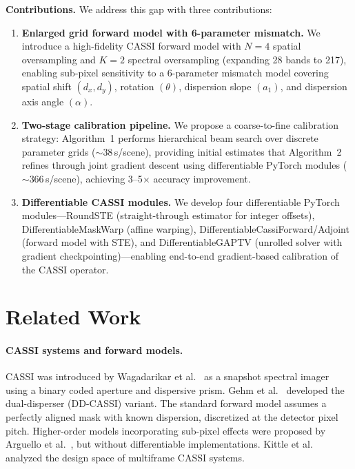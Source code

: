 \documentclass[runningheads]{llncs}
\begin{document}
\textbf{Contributions.}
We address this gap with three contributions:
\begin{enumerate}
    \item \textbf{Enlarged grid forward model with 6-parameter mismatch.}
    We introduce a high-fidelity CASSI forward model with $N\!=\!4$ spatial oversampling and $K\!=\!2$ spectral oversampling (expanding 28 bands to 217), enabling sub-pixel sensitivity to a 6-parameter mismatch model covering spatial shift $(d_x, d_y)$, rotation $(\theta)$, dispersion slope $(a_1)$, and dispersion axis angle $(\alpha)$.

    \item \textbf{Two-stage calibration pipeline.}
    We propose a coarse-to-fine calibration strategy: Algorithm~1 performs hierarchical beam search over discrete parameter grids ($\sim$38\,s/scene), providing initial estimates that Algorithm~2 refines through joint gradient descent using differentiable PyTorch modules ($\sim$366\,s/scene), achieving 3--5$\times$ accuracy improvement.

    \item \textbf{Differentiable CASSI modules.}
    We develop four differentiable PyTorch modules---RoundSTE (straight-through estimator for integer offsets), DifferentiableMaskWarp (affine warping), DifferentiableCassiForward/Adjoint (forward model with STE), and DifferentiableGAPTV (unrolled solver with gradient checkpointing)---enabling end-to-end gradient-based calibration of the CASSI operator.
\end{enumerate}

\section{Related Work}
\label{sec:related}

\paragraph{CASSI systems and forward models.}
CASSI was introduced by Wagadarikar et al.~\cite{wagadarikar2008cassi} as a snapshot spectral imager using a binary coded aperture and dispersive prism.
Gehm et al.~\cite{gehm2007cassi} developed the dual-disperser (DD-CASSI) variant.
The standard forward model assumes a perfectly aligned mask with known dispersion, discretized at the detector pixel pitch.
Higher-order models incorporating sub-pixel effects were proposed by Arguello et al.~\cite{arguello2013cassi_calib}, but without differentiable implementations.
Kittle et al.~\cite{kittle2010cassi_design} analyzed the design space of multiframe CASSI systems.
\end{document}
